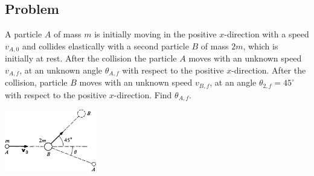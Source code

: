 \documentclass[solutions]{esg8012pset}
\begin{document}
\subsection*{Problem}
  A particle $A$ of mass $m$ is initially moving in the positive $x$-direction with a speed $v_{A,0}$ and collides elastically with a second particle $B$ of mass $2m$, which is initially at rest.  After the collision the particle $A$ moves with an unknown speed $v_{A,f}$, at an unknown angle $\theta_{A, f}$ with respect to the positive $x$-direction. After the collision, particle $B$ moves with an unknown speed $v_{B, f}$, at an angle $\theta_{2,f} = 45^{\circ}$ with respect to the positive $x$-direction.  Find $\theta_{A, f}$.
  \begin{center}\includegraphics[width=0.3\textwidth]{ps07_3}\end{center}
\end{document}
